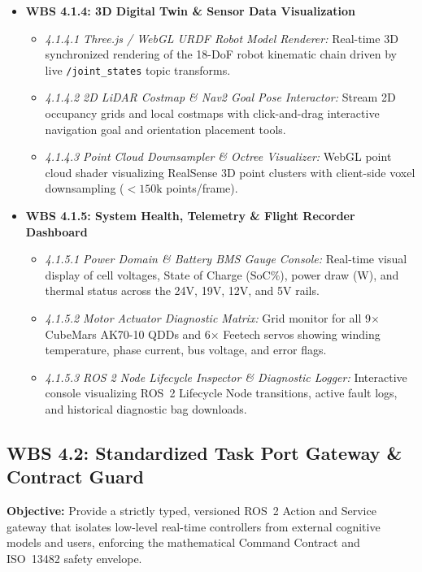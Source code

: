\documentclass[10pt,a4paper]{article}
\begin{document}
\begin{itemize}[leftmargin=1.5em]
    \item \textbf{WBS 4.1.4: 3D Digital Twin \& Sensor Data Visualization}
    \begin{itemize}[leftmargin=1.2em]
        \item \emph{4.1.4.1 Three.js / WebGL URDF Robot Model Renderer:} Real-time 3D synchronized rendering of the 18-DoF robot kinematic chain driven by live \texttt{/joint\_states} topic transforms.
        \item \emph{4.1.4.2 2D LiDAR Costmap \& Nav2 Goal Pose Interactor:} Stream 2D occupancy grids and local costmaps with click-and-drag interactive navigation goal and orientation placement tools.
        \item \emph{4.1.4.3 Point Cloud Downsampler \& Octree Visualizer:} WebGL point cloud shader visualizing RealSense 3D point clusters with client-side voxel downsampling ($<150\text{k}$ points/frame).
    \end{itemize}

    \item \textbf{WBS 4.1.5: System Health, Telemetry \& Flight Recorder Dashboard}
    \begin{itemize}[leftmargin=1.2em]
        \item \emph{4.1.5.1 Power Domain \& Battery BMS Gauge Console:} Real-time visual display of cell voltages, State of Charge ($\text{SoC}\%$), power draw (W), and thermal status across the 24V, 19V, 12V, and 5V rails.
        \item \emph{4.1.5.2 Motor Actuator Diagnostic Matrix:} Grid monitor for all 9$\times$ CubeMars AK70-10 QDDs and 6$\times$ Feetech servos showing winding temperature, phase current, bus voltage, and error flags.
        \item \emph{4.1.5.3 ROS 2 Node Lifecycle Inspector \& Diagnostic Logger:} Interactive console visualizing ROS~2 Lifecycle Node transitions, active fault logs, and historical diagnostic bag downloads.
    \end{itemize}
\end{itemize}

\subsection{WBS 4.2: Standardized Task Port Gateway \& Contract Guard}
\textbf{Objective:} Provide a strictly typed, versioned ROS~2 Action and Service gateway that isolates low-level real-time controllers from external cognitive models and users, enforcing the mathematical Command Contract and ISO~13482 safety envelope.
\end{document}
